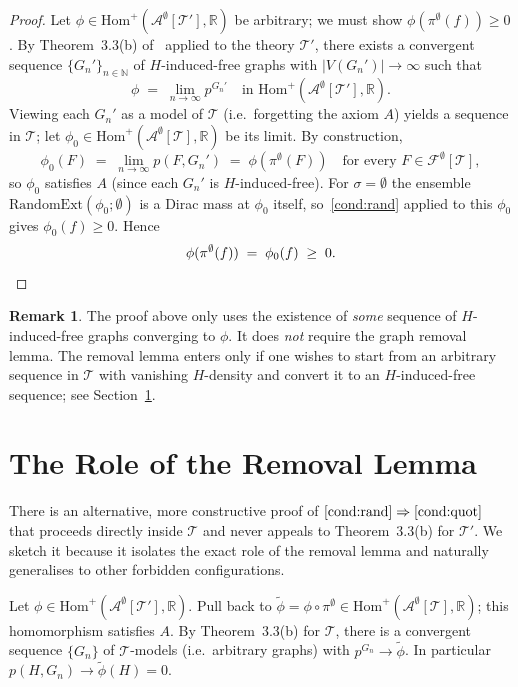 \documentclass[11pt]{article}
\theoremstyle{definition}
\newtheorem{remark}[theorem]{Remark}
\newcommand{\R}{\mathbb{R}}
\newcommand{\N}{\mathbb{N}}
\newcommand{\A}{\mathcal{A}}
\newcommand{\F}{\mathcal{F}}
\newcommand{\T}{\mathcal{T}}
\newcommand{\Homp}{\mathrm{Hom}^{+}}
\newcommand{\RandomExt}{\mathrm{RandomExt}}
\begin{document}
\begin{proof}
Let $\phi \in \Homp(\A^{\emptyset}[\T'], \R)$ be arbitrary; we must show
$\phi(\pi^{\emptyset}(f)) \geq 0$. By Theorem~3.3(b) of~\cite{Razborov2007}
applied to the theory $\T'$, there exists a convergent sequence
$\{G_n'\}_{n \in \N}$ of $H$-induced-free graphs with $|V(G_n')| \to \infty$
such that
\[
  \phi \;=\; \lim_{n \to \infty} p^{G_n'} \quad \text{in } \Homp(\A^{\emptyset}[\T'], \R).
\]
Viewing each $G_n'$ as a model of $\T$ (i.e.\ forgetting the axiom $A$) yields
a sequence in $\T$; let $\phi_0 \in \Homp(\A^{\emptyset}[\T], \R)$ be its
limit. By construction,
\[
  \phi_0(F) \;=\; \lim_{n \to \infty} p(F, G_n') \;=\; \phi(\pi^{\emptyset}(F))
  \quad \text{for every } F \in \F^{\emptyset}[\T],
\]
so $\phi_0$ satisfies $A$ (since each $G_n'$ is $H$-induced-free). For
$\sigma = \emptyset$ the ensemble $\RandomExt(\phi_0; \emptyset)$ is a Dirac
mass at $\phi_0$ itself, so~\ref{cond:rand} applied to this $\phi_0$ gives
$\phi_0(f) \geq 0$. Hence
\[
  \phi(\pi^{\emptyset}(f)) \;=\; \phi_0(f) \;\geq\; 0. \qedhere
\]
\end{proof}

\begin{remark}
The proof above only uses the existence of \emph{some} sequence of
$H$-induced-free graphs converging to $\phi$. It does \emph{not} require the
graph removal lemma. The removal lemma enters only if one wishes to start
from an arbitrary sequence in $\T$ with vanishing $H$-density and convert it
to an $H$-induced-free sequence; see Section~\ref{sec:rl}.
\end{remark}

\section{The Role of the Removal Lemma}\label{sec:rl}

There is an alternative, more constructive proof of $\ref{cond:rand}
\Rightarrow \ref{cond:quot}$ that proceeds directly inside $\T$ and never
appeals to Theorem~3.3(b) for $\T'$. We sketch it because it isolates the
exact role of the removal lemma and naturally generalises to other forbidden
configurations.

Let $\phi \in \Homp(\A^{\emptyset}[\T'], \R)$. Pull back to
$\widetilde{\phi} = \phi \circ \pi^{\emptyset} \in \Homp(\A^{\emptyset}[\T],
\R)$; this homomorphism satisfies $A$. By Theorem~3.3(b) for $\T$, there is a
convergent sequence $\{G_n\}$ of $\T$-models (i.e.\ arbitrary graphs) with
$p^{G_n} \to \widetilde{\phi}$. In particular $p(H, G_n) \to
\widetilde{\phi}(H) = 0$.
\end{document}
